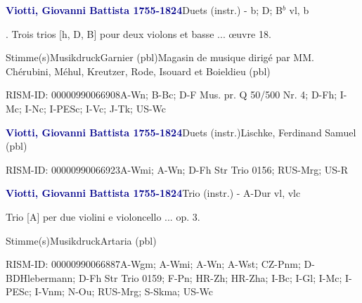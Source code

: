 \documentclass[twocolumn, 12pt]{book}
\begin{document}
\par \vspace{16pt} \textcolor{darkblue}{\textbf{Viotti, Giovanni Battista  1755-1824}}\hfillplus{\textbf{[337]}}\newline Duets (instr.) - b; D; B$^b$ vl, b
\par \begin{itshape}. Trois trios [h, D, B] pour deux violons et basse ... œuvre 18.\end{itshape} 
\par \textcolor{darkblue}{}  Stimme(s)\newline Musikdruck\newline Garnier  (pbl)\newline Magasin de musique dirigé par MM. Chérubini, Méhul, Kreutzer, Rode, Isouard et Boieldieu  (pbl)
\par RISM-ID: 00000990066908\newline A-Wn; B-Bc; D-F  Mus. pr. Q 50/500 Nr. 4; D-Fh; I-Mc; I-Nc; I-PESc; I-Vc; J-Tk; US-Wc
\par \vspace{16pt} \textcolor{darkblue}{\textbf{Viotti, Giovanni Battista  1755-1824}}\hfillplus{\textbf{[338]}}\newline Duets (instr.)\newline Lischke, Ferdinand Samuel  (pbl)
\par RISM-ID: 00000990066923\newline A-Wmi; A-Wn; D-Fh  Str Trio 0156; RUS-Mrg; US-R
\par \vspace{16pt} \textcolor{darkblue}{\textbf{Viotti, Giovanni Battista  1755-1824}}\hfillplus{\textbf{[339]}}\newline Trio (instr.) - A-Dur vl, vlc
\par \begin{itshape}Trio [A] per due violini e violoncello ... op. 3.\end{itshape} 
\par \textcolor{darkblue}{}  Stimme(s)\newline Musikdruck\newline Artaria  (pbl)
\par RISM-ID: 00000990066887\newline A-Wgm; A-Wmi; A-Wn; A-Wst; CZ-Pnm; D-BDHlebermann; D-Fh  Str Trio 0159; F-Pn; HR-Zh; HR-Zha; I-Bc; I-Gl; I-Mc; I-PESc; I-Vnm; N-Ou; RUS-Mrg; S-Skma; US-Wc
\end{document}
